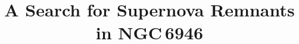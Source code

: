 %


\usepackage{natbib}
\usepackage{comment}



\title{A Search for Supernova Remnants in NGC\,6946}



